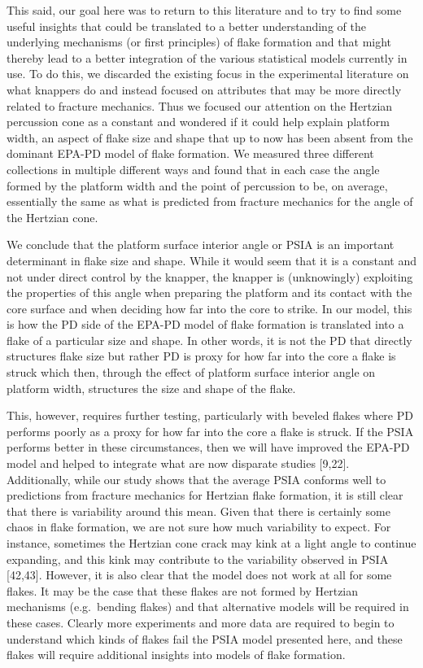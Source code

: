 \documentclass[10pt,letterpaper]{article}
\begin{document}
This said, our goal here was to return to this literature and to try to
find some useful insights that could be translated to a better
understanding of the underlying mechanisms (or first principles) of
flake formation and that might thereby lead to a better integration of
the various statistical models currently in use. To do this, we
discarded the existing focus in the experimental literature on what
knappers do and instead focused on attributes that may be more directly
related to fracture mechanics. Thus we focused our attention on the
Hertzian percussion cone as a constant and wondered if it could help
explain platform width, an aspect of flake size and shape that up to now
has been absent from the dominant EPA-PD model of flake formation. We
measured three different collections in multiple different ways and
found that in each case the angle formed by the platform width and the
point of percussion to be, on average, essentially the same as what is
predicted from fracture mechanics for the angle of the Hertzian cone.

We conclude that the platform surface interior angle or PSIA is an
important determinant in flake size and shape. While it would seem that
it is a constant and not under direct control by the knapper, the
knapper is (unknowingly) exploiting the properties of this angle when
preparing the platform and its contact with the core surface and when
deciding how far into the core to strike. In our model, this is how the
PD side of the EPA-PD model of flake formation is translated into a
flake of a particular size and shape. In other words, it is not the PD
that directly structures flake size but rather PD is proxy for how far
into the core a flake is struck which then, through the effect of
platform surface interior angle on platform width, structures the size
and shape of the flake.

This, however, requires further testing, particularly with beveled
flakes where PD performs poorly as a proxy for how far into the core a
flake is struck. If the PSIA performs better in these circumstances,
then we will have improved the EPA-PD model and helped to integrate what
are now disparate studies {[}9,22{]}. Additionally, while our study
shows that the average PSIA conforms well to predictions from fracture
mechanics for Hertzian flake formation, it is still clear that there is
variability around this mean. Given that there is certainly some chaos
in flake formation, we are not sure how much variability to expect. For
instance, sometimes the Hertzian cone crack may kink at a light angle to
continue expanding, and this kink may contribute to the variability
observed in PSIA {[}42,43{]}. However, it is also clear that the model
does not work at all for some flakes. It may be the case that these
flakes are not formed by Hertzian mechanisms (e.g.~bending flakes) and
that alternative models will be required in these cases. Clearly more
experiments and more data are required to begin to understand which
kinds of flakes fail the PSIA model presented here, and these flakes
will require additional insights into models of flake formation.
\end{document}
